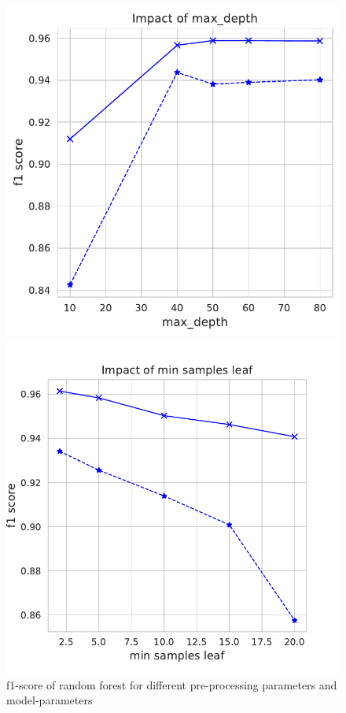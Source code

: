 \documentclass[11pt]{article}
\begin{document}
\begin{figure}
\begin{minipage}[l]{0.3\textwidth}
\end{minipage}
\begin{minipage}[l]{0.3\textwidth}
\includegraphics[width=1\linewidth]{email_spam/rnd_depth.pdf}
\end{minipage}
\begin{minipage}[l]{0.3\textwidth}
\includegraphics[width=1\linewidth]{email_spam/rnd_min_samples_leaf.pdf}
\end{minipage}
   \caption{f1-score of random forest for different pre-processing parameters and model-parameters}
\label{spamfig_fig2}
\end{figure}
\end{document}
